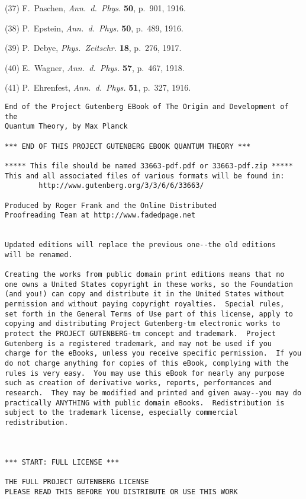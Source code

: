 \documentclass[12pt,oneside]{book}
\begin{document}
(37) F.~Paschen, \textit{Ann.\ d.\ Phys.} \textbf{50}, p.\ 901, 1916.

(38) P.~Epstein, \textit{Ann.\ d.\ Phys.} \textbf{50}, p.\ 489, 1916.

(39) P.~Debye, \textit{Phys.\ Zeitschr.} \textbf{18}, p.\ 276, 1917.

(40) E.~Wagner, \textit{Ann.\ d.\ Phys.} \textbf{57}, p.\ 467, 1918.

(41) P.~Ehrenfest, \textit{Ann.\ d.\ Phys.} \textbf{51}, p.\ 327, 1916.

\clearpage
{}

\small
\begin{verbatim}
End of the Project Gutenberg EBook of The Origin and Development of the
Quantum Theory, by Max Planck

*** END OF THIS PROJECT GUTENBERG EBOOK QUANTUM THEORY ***

***** This file should be named 33663-pdf.pdf or 33663-pdf.zip *****
This and all associated files of various formats will be found in:
        http://www.gutenberg.org/3/3/6/6/33663/

Produced by Roger Frank and the Online Distributed
Proofreading Team at http://www.fadedpage.net


Updated editions will replace the previous one--the old editions
will be renamed.

Creating the works from public domain print editions means that no
one owns a United States copyright in these works, so the Foundation
(and you!) can copy and distribute it in the United States without
permission and without paying copyright royalties.  Special rules,
set forth in the General Terms of Use part of this license, apply to
copying and distributing Project Gutenberg-tm electronic works to
protect the PROJECT GUTENBERG-tm concept and trademark.  Project
Gutenberg is a registered trademark, and may not be used if you
charge for the eBooks, unless you receive specific permission.  If you
do not charge anything for copies of this eBook, complying with the
rules is very easy.  You may use this eBook for nearly any purpose
such as creation of derivative works, reports, performances and
research.  They may be modified and printed and given away--you may do
practically ANYTHING with public domain eBooks.  Redistribution is
subject to the trademark license, especially commercial
redistribution.



*** START: FULL LICENSE ***

THE FULL PROJECT GUTENBERG LICENSE
PLEASE READ THIS BEFORE YOU DISTRIBUTE OR USE THIS WORK


\end{verbatim}
\end{document}
